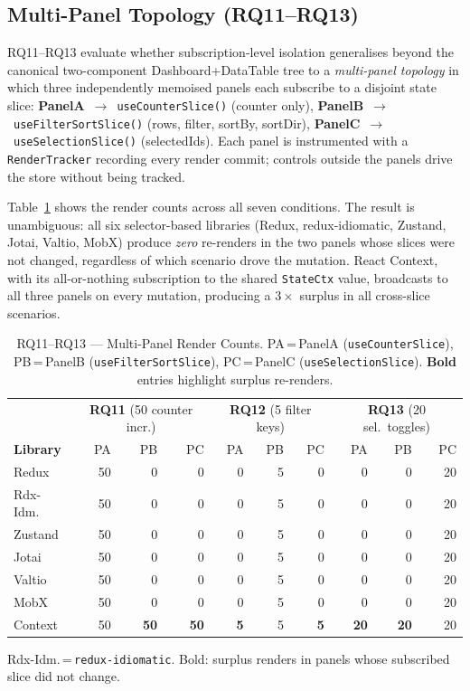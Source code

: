 \documentclass[conference]{IEEEtran}
\newcommand{\code}[1]{\texttt{\small #1}}
\begin{document}
\subsection{Multi-Panel Topology (RQ11--RQ13)}

RQ11--RQ13 evaluate whether subscription-level isolation generalises
beyond the canonical two-component Dashboard+DataTable tree to a
\emph{multi-panel topology} in which three independently memoised panels
each subscribe to a disjoint state slice:
\textbf{PanelA}~$\to$~\code{useCounterSlice()} (counter only),
\textbf{PanelB}~$\to$~\code{useFilterSortSlice()} (rows, filter, sortBy, sortDir),
\textbf{PanelC}~$\to$~\code{useSelectionSlice()} (selectedIds).
Each panel is instrumented with a \code{RenderTracker} recording every
render commit; controls outside the panels drive the store
without being tracked.

Table~\ref{tab:multipanel} shows the render counts across all seven
conditions. The result is unambiguous: all six selector-based libraries
(Redux, redux-idiomatic, Zustand, Jotai, Valtio, MobX) produce
\emph{zero} re-renders in the two panels whose slices were not changed,
regardless of which scenario drove the mutation. React Context, with its
all-or-nothing subscription to the shared \code{StateCtx} value, broadcasts
to all three panels on every mutation, producing a $3{\times}$ surplus
in all cross-slice scenarios.

\begin{table}[tb]
\caption{RQ11--RQ13 --- Multi-Panel Render Counts. PA\,=\,PanelA
  (\code{useCounterSlice}), PB\,=\,PanelB (\code{useFilterSortSlice}),
  PC\,=\,PanelC (\code{useSelectionSlice}).
  \textbf{Bold} entries highlight surplus re-renders.}
\label{tab:multipanel}
\begin{center}
\scriptsize
\setlength{\tabcolsep}{3pt}
\begin{tabular}{l|rrr|rrr|rrr}
\toprule
& \multicolumn{3}{c|}{\textbf{RQ11} (50 counter incr.)}
& \multicolumn{3}{c|}{\textbf{RQ12} (5 filter keys)}
& \multicolumn{3}{c}{\textbf{RQ13} (20 sel.\ toggles)} \\
\textbf{Library} & PA & PB & PC & PA & PB & PC & PA & PB & PC \\
\midrule
Redux       & 50 & 0 & 0 & 0 & 5  & 0 & 0 & 0  & 20 \\
Rdx-Idm.    & 50 & 0 & 0 & 0 & 5  & 0 & 0 & 0  & 20 \\
Zustand     & 50 & 0 & 0 & 0 & 5  & 0 & 0 & 0  & 20 \\
Jotai       & 50 & 0 & 0 & 0 & 5  & 0 & 0 & 0  & 20 \\
Valtio      & 50 & 0 & 0 & 0 & 5  & 0 & 0 & 0  & 20 \\
MobX        & 50 & 0 & 0 & 0 & 5  & 0 & 0 & 0  & 20 \\
\midrule
Context     & 50 & \textbf{50} & \textbf{50}
            & \textbf{5} & 5 & \textbf{5}
            & \textbf{20} & \textbf{20} & 20 \\
\bottomrule
\end{tabular}
\end{center}
\parbox{\columnwidth}{\scriptsize Rdx-Idm.\,=\,\code{redux-idiomatic}.
  Bold: surplus renders in panels whose subscribed slice did not change.}
\end{table}
\end{document}
